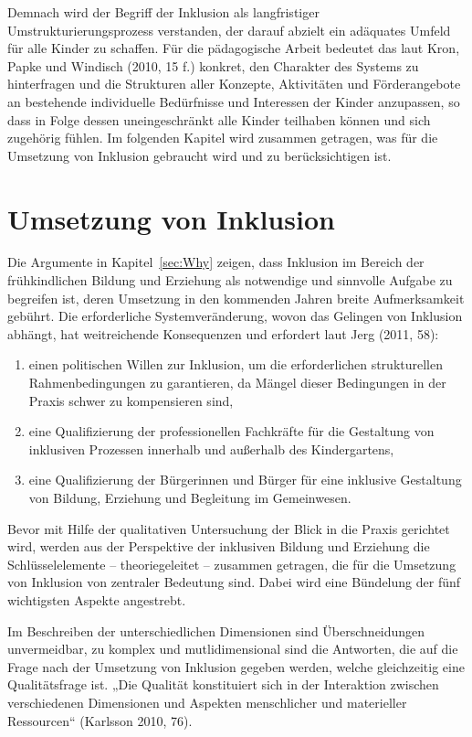 Demnach wird der Begriff der Inklusion als langfristiger Umstrukturierungsprozess verstanden, der darauf abzielt ein adäquates  Umfeld für alle Kinder zu schaffen. Für die pädagogische Arbeit bedeutet das laut Kron, Papke und Windisch (2010, 15 f.) konkret, den Charakter des Systems zu hinterfragen und die Strukturen aller Konzepte, Aktivitäten und Förderangebote an bestehende individuelle Bedürfnisse und Interessen der Kinder anzupassen, so dass in Folge dessen uneingeschränkt alle Kinder teilhaben können und sich zugehörig fühlen.
Im folgenden Kapitel wird zusammen getragen, was für die Umsetzung von Inklusion gebraucht wird und zu berücksichtigen ist.

\section{Umsetzung von Inklusion}
\label{sec:Wie} 

Die Argumente in Kapitel~\ref{sec:Why} zeigen, dass Inklusion im Bereich der frühkindlichen Bildung und Erziehung als notwendige und sinnvolle Aufgabe zu begreifen ist, deren Umsetzung in den kommenden Jahren breite Aufmerksamkeit gebührt. Die erforderliche Systemveränderung, wovon das Gelingen von Inklusion abhängt, hat weitreichende Konsequenzen und erfordert laut Jerg (2011, 58):

\begin{enumerate}
\item einen politischen Willen zur Inklusion, um die erforderlichen strukturellen Rahmenbedingungen zu garantieren, da Mängel dieser Bedingungen in der Praxis schwer zu kompensieren sind,
\item eine Qualifizierung der professionellen Fachkräfte für die Gestaltung von inklusiven Prozessen innerhalb und außerhalb des Kindergartens,
\item eine Qualifizierung der Bürgerinnen und Bürger für eine inklusive Gestaltung von Bildung, Erziehung und Begleitung im Gemeinwesen.
\end{enumerate}

Bevor mit Hilfe der qualitativen Untersuchung der Blick in die Praxis gerichtet wird, werden aus der Perspektive der inklusiven Bildung und Erziehung die Schlüsselelemente -- theoriegeleitet -- zusammen getragen, die für die Umsetzung von Inklusion von zentraler Bedeutung sind.
Dabei wird eine Bündelung der fünf wichtigsten Aspekte angestrebt.

Im Beschreiben der unterschiedlichen Dimensionen sind Überschneidungen unvermeidbar, zu komplex und mutlidimensional sind die Antworten, die auf die Frage nach der Umsetzung von Inklusion gegeben werden, welche  gleichzeitig eine Qualitätsfrage ist.  
„Die Qualität konstituiert sich in der Interaktion zwischen verschiedenen Dimensionen und Aspekten menschlicher und materieller Ressourcen“ (Karlsson 2010, 76).

